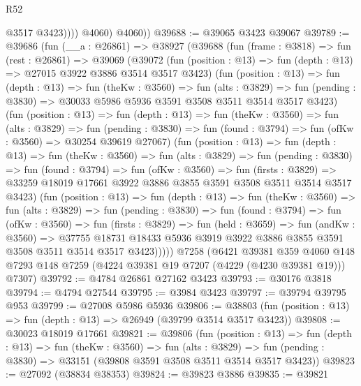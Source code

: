 \begin{lexlean}{R52}
\begin{coremodule}
                  @3517
                  @3423))))
          @4060)
        @4060))
@39688 := @39065 @3423 @39067
@39789 := @39686
    (fun (__a : @26861) =>
    @38927
      (@39688
        (fun (frame : @3818) =>
        fun (rest : @26861) =>
        @39069
          (@39072
            (fun (position : @13) => fun (depth : @13) => @27015 @3922 @3886 @3514 @3517 @3423)
            (fun (position : @13) =>
            fun (depth : @13) =>
            fun (theKw : @3560) =>
            fun (alts : @3829) =>
            fun (pending : @3830) => @30033 @5986 @5936 @3591 @3508 @3511 @3514 @3517 @3423)
            (fun (position : @13) =>
            fun (depth : @13) =>
            fun (theKw : @3560) =>
            fun (alts : @3829) =>
            fun (pending : @3830) =>
            fun (found : @3794) => fun (ofKw : @3560) => @30254 @39619 @27067)
            (fun (position : @13) =>
            fun (depth : @13) =>
            fun (theKw : @3560) =>
            fun (alts : @3829) =>
            fun (pending : @3830) =>
            fun (found : @3794) =>
            fun (ofKw : @3560) =>
            fun (firsts : @3829) =>
            @33259 @18019 @17661 @3922 @3886 @3855 @3591 @3508 @3511 @3514 @3517 @3423)
            (fun (position : @13) =>
            fun (depth : @13) =>
            fun (theKw : @3560) =>
            fun (alts : @3829) =>
            fun (pending : @3830) =>
            fun (found : @3794) =>
            fun (ofKw : @3560) =>
            fun (firsts : @3829) =>
            fun (held : @3659) =>
            fun (andKw : @3560) =>
            @37755
              @18731
              @18433
              @5936
              @3919
              @3922
              @3886
              @3855
              @3591
              @3508
              @3511
              @3514
              @3517
              @3423)))))
    @7258
    (@6421
      @39381
      @359
      @4060
      @148
      @7293
      @148
      @7259
      (@4224 @39381 @19 @7207 (@4229 (@4230 @39381 @19)))
      @7307)
@39792 := @4784 @26861 @27162 @3423
@39793 := @30176 @3818
@39794 := @4794 @27544
@39795 := @3984 @3423
@39797 := @39794 @39795 @953
@39799 := @27008 @5986 @5936
@39806 := @38803 (fun (position : @13) => fun (depth : @13) => @26949 (@39799 @3514 @3517 @3423))
@39808 := @30023 @18019 @17661
@39821 := @39806
    (fun (position : @13) =>
    fun (depth : @13) =>
    fun (theKw : @3560) =>
    fun (alts : @3829) =>
    fun (pending : @3830) => @33151 (@39808 @3591 @3508 @3511 @3514 @3517 @3423))
@39823 := @27092 (@38834 @38353)
@39824 := @39823 @3886
@39835 := @39821

\end{coremodule}
\end{lexlean}
